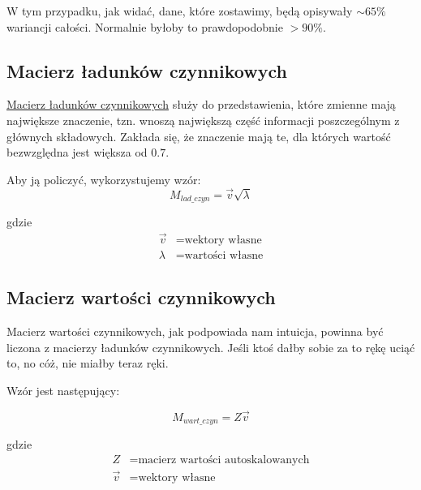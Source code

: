 \documentclass[12pt, a4paper]{article}
\begin{document}
        W tym przypadku, jak widać, dane, które zostawimy, będą opisywały $\sim 65\%$ wariancji całości. Normalnie byłoby to prawdopodobnie $>90\%$.
        
    \subsection{Macierz ładunków czynnikowych}
        
        \href{file:./graphics/m_lad.png}{Macierz ładunków czynnikowych} służy do przedstawienia, które zmienne mają największe znaczenie, tzn. wnoszą największą część
        informacji poszczególnym z głównych składowych. Zakłada się, że znaczenie mają te, dla których wartość bezwzględna jest większa od $0.7$.

        Aby ją policzyć, wykorzystujemy wzór:
        \begin{equation}
            M_{lad\_czyn} = \overrightarrow{v} \sqrt{\lambda}
        \end{equation}

        gdzie\\

        \begin{align*}
            \overrightarrow{v} &= \text{wektory własne}\\
            \lambda &= \text{wartości własne}
        \end{align*}

    \subsection{Macierz wartości czynnikowych}
        
        Macierz wartości czynnikowych, jak podpowiada nam intuicja, powinna być liczona z macierzy ładunków czynnikowych. Jeśli ktoś dałby sobie za
        to rękę uciąć to, no cóż, nie miałby teraz ręki.

        Wzór jest następujący:

        \begin{equation}
            M_{wart\_czyn} = Z \overrightarrow{v}
        \end{equation}

        gdzie\\

        \begin{align*}
            Z &= \text{macierz wartości autoskalowanych}\\
            \overrightarrow{v} &= \text{wektory własne}
        \end{align*}
\end{document}
